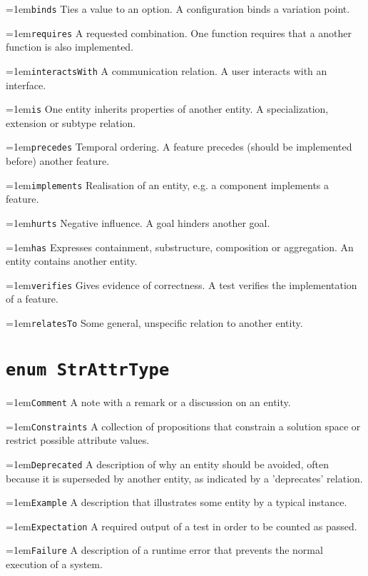 \documentclass[a4paper,oneside]{article}
\begin{document}
\begin{multicols*}{4}
\hangindent=1em\lstinline+binds+ Ties a value to an option. A configuration binds a variation point. 

\hangindent=1em\lstinline+requires+ A requested combination. One function requires that a another function is also implemented. 

\hangindent=1em\lstinline+interactsWith+ A communication relation. A user interacts with an interface. 

\hangindent=1em\lstinline+is+ One entity inherits properties of another entity. A specialization, extension or subtype relation.  

\hangindent=1em\lstinline+precedes+ Temporal ordering. A feature precedes (should be implemented before) another feature. 

\hangindent=1em\lstinline+implements+ Realisation of an entity, e.g. a component implements a feature. 

\hangindent=1em\lstinline+hurts+ Negative influence. A goal hinders another goal. 

\hangindent=1em\lstinline+has+ Expresses containment, substructure, composition or aggregation. An entity contains another entity. 

\hangindent=1em\lstinline+verifies+ Gives evidence of correctness. A test verifies the implementation of a feature. 

\hangindent=1em\lstinline+relatesTo+ Some general, unspecific relation to another entity. 


\section*{\texttt{enum StrAttrType}}
\hangindent=1em\lstinline+Comment+ A note with a remark or a discussion on an entity. 

\hangindent=1em\lstinline+Constraints+ A collection of propositions that constrain a solution space or restrict possible attribute values. 

\hangindent=1em\lstinline+Deprecated+ A description of why an entity should be avoided, often because it is superseded by another entity, as indicated by a 'deprecates' relation. 

\hangindent=1em\lstinline+Example+ A description that illustrates some entity by a typical instance. 

\hangindent=1em\lstinline+Expectation+ A required output of a test in order to be counted as passed. 

\hangindent=1em\lstinline+Failure+ A description of a runtime error that prevents the normal execution of a system. 


\end{multicols*}
\end{document}
